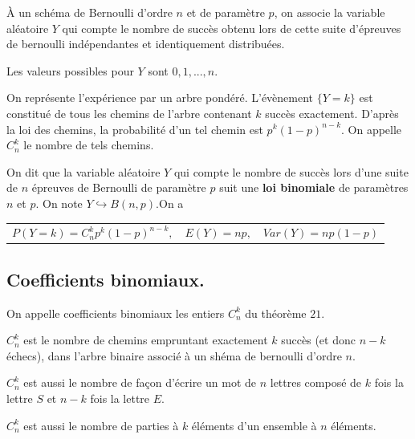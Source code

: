 \documentclass[a4paper,11pt]{article}
\theoremstyle{break}
\begin{document}
 
  
  \begin{definition}
  \`A un schéma de Bernoulli d'ordre $n$ et de paramètre $p$, on associe la variable aléatoire $Y$
  qui compte le nombre de succès obtenu lors de cette suite d'épreuves de bernoulli indépendantes et 
  identiquement distribuées. 
  
  Les valeurs possibles pour $Y$ sont $0,1,...,n$.
 \end{definition}
  On représente l'expérience par un arbre pondéré. L'évènement $\lbrace Y=k \rbrace$ est constitué 
  de tous les chemins de l'arbre contenant $k$ succès exactement. D'après la loi des chemins, la probabilité
  d'un tel chemin est $p^k(1-p)^{n-k}$. On appelle $C_n^k$ le nombre de tels chemins.


  \begin{theorem}
   On dit que la variable aléatoire $Y$ qui compte le nombre de succès lors d'une suite de $n$ épreuves
   de Bernoulli de paramètre $p$ suit une \textbf{loi binomiale} de paramètres $n$ et $p$. On note 
   $Y \hookrightarrow B(n,p)$.On a 
   \begin{centering}
      \begin{tabular}{c c c}
   $P(Y=k)=C_n^k p^k (1-p)^{n-k},$& $E(Y)=np,$ & $Var(Y)=np(1-p)$ 
   \end{tabular}

   \end{centering}

   
   
   
  \end{theorem}
  
  \subsection{Coefficients binomiaux.}


\begin{definition}
 On appelle coefficients binomiaux les entiers $C_n^k$ du théorème $21$.
 
 $C_n^k$ est le nombre de chemins empruntant exactement $k$ succès (et donc $n-k$ échecs),
 dans l'arbre binaire associé à un shéma de bernoulli d'ordre $n$.
 
 $C_n^k$ est aussi le nombre de façon d'écrire un mot de $n$ lettres composé de $k$ fois la 
 lettre $S$ et $n-k$ fois la lettre $E$.
 
 $C_n^k$ est aussi le nombre de parties à $k$ éléments d'un ensemble à $n$ éléments.
\end{definition}
\end{document}
